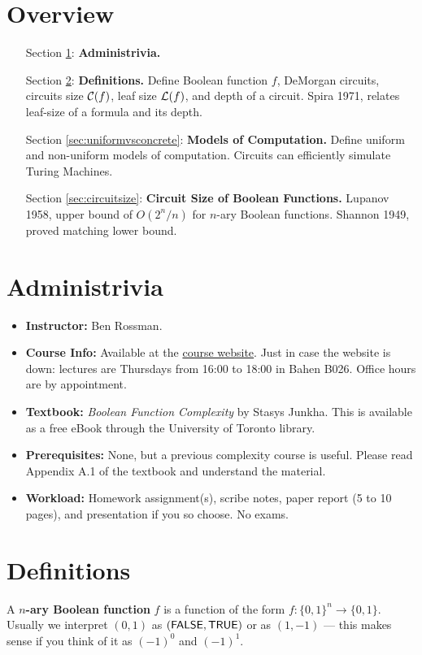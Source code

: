\documentclass[11pt]{article}
\begin{document}

\section*{Overview}
\begin{itemize}
	\item [Section \ref{sec:admin}:] \textbf{Administrivia.}
	\item [Section \ref{section:definitions}:] \textbf{Definitions.} Define Boolean function $f$, DeMorgan circuits, circuits size $\operatorname*{\mathcal{C}}(f)$, leaf size $\operatorname*{\mathcal{L}}(f)$, and depth of a circuit. Spira 1971, relates leaf-size of a formula and its depth. 
	\item [Section \ref{sec:uniformvsconcrete}:] \textbf{Models of Computation.} Define uniform and non-uniform models of computation. Circuits can efficiently simulate Turing Machines. 
	\item [Section \ref{sec:circuitsize}:] \textbf{Circuit Size of Boolean Functions.} Lupanov 1958, upper bound of $O(2^{n}/n)$ for $n$-ary Boolean functions. Shannon 1949, proved matching lower bound.
\end{itemize}

\section{Administrivia}
\label{sec:admin}
\begin{itemize}
	\item \textbf{Instructor:} Ben Rossman. 
	\item \textbf{Course Info:} Available at the \href{http://www.math.toronto.edu/rossman/CSC2429.html}{course website}. Just in case the website is down: lectures are Thursdays from 16:00 to 18:00 in Bahen B026. Office hours are by appointment.
	\item \textbf{Textbook:} \emph{Boolean Function Complexity} by Stasys Junkha. This is available as a free eBook through the University of Toronto library. 
	\item \textbf{Prerequisites:} None, but a previous complexity course is useful. Please read Appendix A.1 of the textbook and understand the material.
	\item \textbf{Workload:} Homework assignment(s), scribe notes, paper report (5 to 10 pages), and presentation if you so choose. No exams.
\end{itemize}

\section{Definitions}
\label{section:definitions}
\begin{definition}
	A \textbf{$n$-ary Boolean function} $f$ is a function of the form $f: \{0,1\}^n \rightarrow \{0,1\}$. Usually we interpret $(0,1)$ as $(\operatorname*{\mathsf{FALSE}}, \operatorname*{\mathsf{TRUE}})$ or as $(1,-1)$ --- this makes sense if you think of it as $(-1)^0$ and $(-1)^{1}$.
\end{definition}
\end{document}
